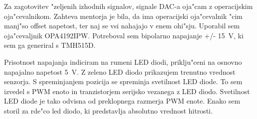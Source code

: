 \documentclass[a4paper]{article}
\begin{document}
Za zagotovitev "zeljenih izhodnih signalov, signale DAC-a oja"cam z operacijskim oja"cevalnikom. Zahteva mentorja je bila, da ima operacijski oja"cevalnik "cim manj"so offset napetost, ter naj se vsi nahajajo v enem ohi"sju. Uporabil sem oja"cevaljnik OPA4192IPW. Potreboval sem bipolarno napajanje +/- 15~V, ki sem ga generiral s TMH515D.

Prisotnost napajanja indiciram na rumeni LED diodi, priklju"ceni na osnovno napajalno napetost 5~V. Z zeleno LED diodo prikazujem trenutno vrednost senzorja. S spreminjanjem pozicija se spreminja svetilnost LED diode. To sem izvedel s PWM enoto in tranzistorjem serijsko vezanega z LED diodo. Svetilnost LED diode je tako odvisna od preklopnega razmerja PWM enote. Enako sem storil za rde"co led diodo, ki predstavlja absolutno vrednost hitrosti.
\end{document}
